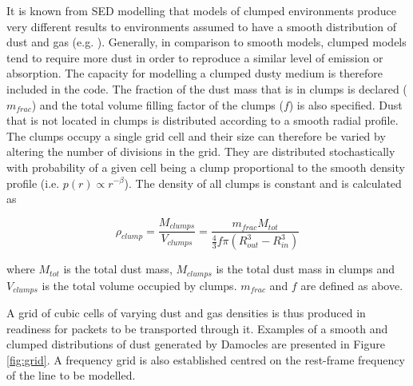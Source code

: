 It is known from SED modelling that models of clumped environments produce very different results to environments assumed to have a smooth distribution of dust and gas (e.g. \citet{Bianchi2000,Ercolano2007,Owen2015}).  Generally, in comparison to smooth models, clumped models tend to require more dust in order to reproduce a similar level of emission or absorption.  The capacity for modelling a clumped dusty medium is therefore included in the code.  The fraction of the dust mass that is in clumps is declared ($m_{frac}$) and the total volume filling factor of the clumps ($f$) is also specified.  Dust that is not located in clumps is distributed according to a smooth radial profile.  The clumps occupy  a single grid cell and their size can therefore be varied by altering the number of divisions in the grid.  They are distributed stochastically with probability of a given cell being a clump proportional to the smooth density profile (i.e. $p(r) \propto r^{-\beta}$).  The density of all clumps is constant and is calculated as 

\begin{equation}
\rho_{clump}=\frac{M_{clumps}}{V_{clumps}}=\frac{m_{frac}M_{tot}}{\frac{4}{3} f\pi (R_{out}^{3}-R_{in}^{3} )}
\end{equation}

\noindent where $M_{tot}$ is the total dust mass, $M_{clumps}$ is the total dust mass in clumps and $V_{clumps}$ is the total volume occupied by clumps.  $m_{frac}$ and $f$ are defined as above.
	
A grid of cubic cells of varying dust and gas densities is thus produced in readiness for packets to be transported through it.  Examples of a smooth and clumped distributions of dust generated by Damocles are presented in Figure \ref{fig:grid}.  A frequency grid is also established centred on the rest-frame frequency of the line to be modelled.

	

